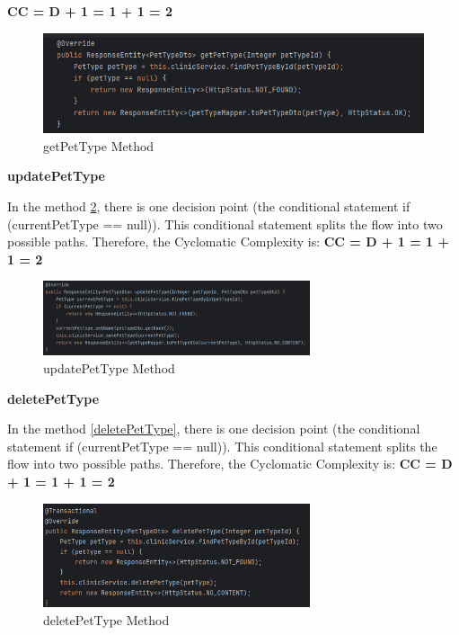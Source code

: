 \documentclass[a4paper,11pt,openright,BCOR=15mm]{scrbook}
\begin{document}
\textbf{CC = D + 1 = 1 + 1 = 2}
\begin{figure}[H]
	\centering
	\includegraphics[width=\textwidth]{figs/Maintainability/getPetType.png}
	\caption{getPetType Method}
	\label{fig:getPetType}
  \end{figure}

\textbf{updatePetType}


In the method \ref{fig:updatePetType}, there is one decision point (the conditional statement if (currentPetType == null)). This conditional statement splits the flow into two possible paths. Therefore, the Cyclomatic Complexity is:
\textbf{CC = D + 1 = 1 + 1 = 2}
\begin{figure}[H]
	\centering
	\includegraphics[width=0.7\textwidth]{figs/Maintainability/updatePetType.png}
	\caption{updatePetType Method}
	\label{fig:updatePetType}
  \end{figure}

\textbf{deletePetType}


In the method \ref{deletePetType}, there is one decision point (the conditional statement if (currentPetType == null)). This conditional statement splits the flow into two possible paths. Therefore, the Cyclomatic Complexity is:
\textbf{CC = D + 1 = 1 + 1 = 2}
\begin{figure}[H]
	\centering
	\includegraphics[width=0.7\textwidth]{figs/Maintainability/deletePetType.png}
	\caption{deletePetType Method}
	\label{fig:deletePetType}
  \end{figure}
\end{document}
